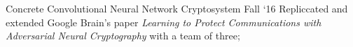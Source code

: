 \project
    {Concrete Convolutional Neural Network Cryptosystem}
    {Fall `16}
    {
        Repliccated and extended Google Brain's paper \textit{Learning to Protect Communications
        with Adversarial Neural Cryptography} with a team of three;
    }
